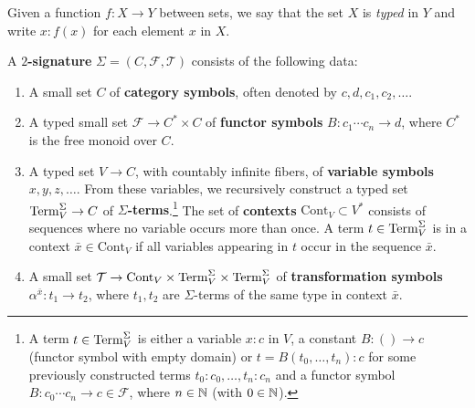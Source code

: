 Given a function $f \colon X \to Y$ between sets, we say that the set $X$ is \emph{typed} in $Y$ and write $x \colon f(x)$ for each element $x$ in $X$.

\begin{definition}
   A \textbf{$2$-signature} $\Sigma = (C,\mathcal{F}, \mathcal{T})$ consists of the following data:
   \begin{enumerate}
       \item A small set $C$ of \textbf{category symbols}, often denoted by $c,d,c_1,c_2,\dots$.
       \item A typed small set $\mathcal{F} \to C^* \times C$ of \textbf{functor symbols} $B \colon c_1 \cdots c_n \to d$, where $C^*$ is the free monoid over $C$.
       \item A typed set $V \to C$, with countably infinite fibers, of \textbf{variable symbols} $x,y,z,\dots$. From these variables, we recursively construct a typed set $\mathrm{Term}^\Sigma_V \to C$ of \textbf{$\Sigma$-terms}.\footnote{A term $t\in \mathrm{Term}_V^\Sigma$ is either a variable $x\colon c$ in $V$, a constant $B\colon ()\to c$ (functor symbol with empty domain) or $t = B(t_0,\ldots, t_n)\colon c$ for some previously constructed terms $t_0\colon c_0,\ldots, t_n\colon c_n$ and a functor symbol $B\colon c_0\cdots c_n\to c\in \mathcal{F}$, where $n\in \mathbb{N}$ (with $0\in \mathbb{N}$).} The set of \textbf{contexts} $\mathrm{Cont}_V \subset V^*$ consists of sequences where no variable occurs more than once. A term $t \in \mathrm{Term}_V^\Sigma$ is in a context $\bar{x} \in \mathrm{Cont}_V$ if all variables appearing in $t$ occur in the sequence $\bar{x}$.
       \item A small set $\mathcal{T} \to \mathrm{Cont}_V \times \mathrm{Term}^\Sigma_V \times \mathrm{Term}^\Sigma_V$ of \textbf{transformation symbols} $\alpha^{\bar{x}} \colon t_1 \to t_2$, where $t_1, t_2$ are $\Sigma$-terms of the same type in context $\bar{x}$.
   \end{enumerate}
\end{definition}
